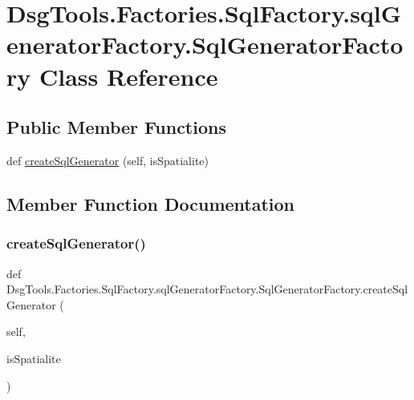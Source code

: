 \hypertarget{class_dsg_tools_1_1_factories_1_1_sql_factory_1_1sql_generator_factory_1_1_sql_generator_factory}{}\section{Dsg\+Tools.\+Factories.\+Sql\+Factory.\+sql\+Generator\+Factory.\+Sql\+Generator\+Factory Class Reference}
\label{class_dsg_tools_1_1_factories_1_1_sql_factory_1_1sql_generator_factory_1_1_sql_generator_factory}
\subsection*{Public Member Functions}
\begin{DoxyCompactItemize}
\item 
def \mbox{\hyperlink{class_dsg_tools_1_1_factories_1_1_sql_factory_1_1sql_generator_factory_1_1_sql_generator_factory_a0db6e91bb2ae20ea974cf5fd59325e4c}{create\+Sql\+Generator}} (self, is\+Spatialite)
\end{DoxyCompactItemize}


\subsection{Member Function Documentation}
\mbox{\label{class_dsg_tools_1_1_factories_1_1_sql_factory_1_1sql_generator_factory_1_1_sql_generator_factory_a0db6e91bb2ae20ea974cf5fd59325e4c}} 
\subsubsection{\texorpdfstring{create\+Sql\+Generator()}{createSqlGenerator()}}
{\footnotesize\ttfamily def Dsg\+Tools.\+Factories.\+Sql\+Factory.\+sql\+Generator\+Factory.\+Sql\+Generator\+Factory.\+create\+Sql\+Generator (\begin{DoxyParamCaption}\item[{}]{self,  }\item[{}]{is\+Spatialite }\end{DoxyParamCaption})}

